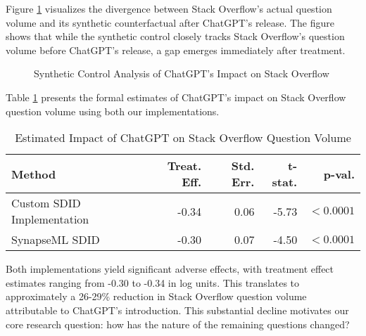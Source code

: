 Figure \ref{fig:synthetic_control} visualizes the divergence between Stack Overflow's actual question volume and its synthetic counterfactual after ChatGPT's release. The figure shows that while the synthetic control closely tracks Stack Overflow's question volume before ChatGPT's release, a gap emerges immediately after treatment.\\

\begin{figure}[htpb!]
    \centering
    
    \caption{Synthetic Control Analysis of ChatGPT's Impact on Stack Overflow}
    \label{fig:synthetic_control}
\end{figure}

Table \ref{tab:results} presents the formal estimates of ChatGPT's impact on Stack Overflow question volume using both our implementations.\\

\begin{table}[htpb!]
\centering
    \begin{tabular}{lrrrr}
        \toprule
        \textbf{Method} & \textbf{Treat. Eff.} & \textbf{Std. Err.} & \textbf{t-stat.} & \textbf{p-val.} \\
        \midrule
        Custom SDID Implementation & -0.34 & 0.06 & -5.73 & $<0.0001$ \\
        SynapseML SDID & -0.30 & 0.07 & -4.50 & $<0.0001$ \\
        \bottomrule
    \end{tabular}
    \caption{Estimated Impact of ChatGPT on Stack Overflow Question Volume}
    \label{tab:results}
\end{table}

Both implementations yield significant adverse effects, with treatment effect estimates ranging from -0.30 to -0.34 in log units. This translates to approximately a 26-29\% reduction in Stack Overflow question volume attributable to ChatGPT's introduction. This substantial decline motivates our core research question: how has the nature of the remaining questions changed?